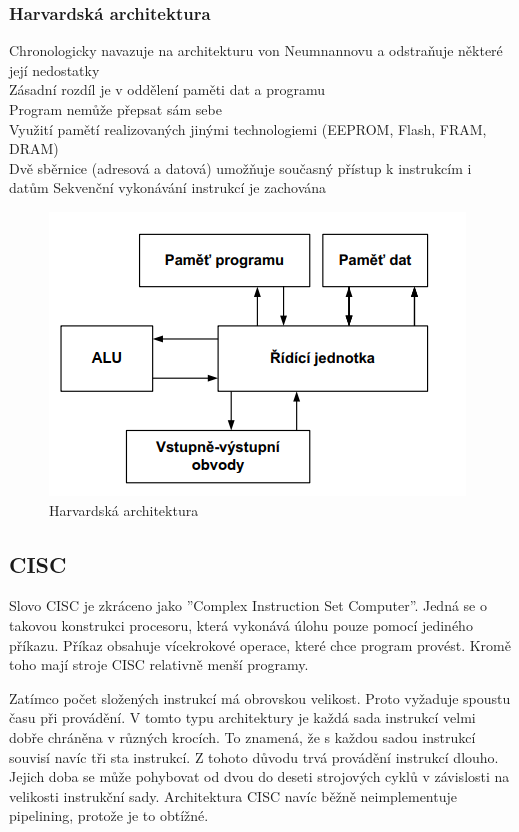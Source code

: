 \subsubsection{Harvardská architektura}
Chronologicky navazuje na architekturu von Neumnannovu a odstraňuje některé její nedostatky\\
Zásadní rozdíl je v oddělení paměti dat a programu\\
Program nemůže přepsat sám sebe\\
Využití pamětí realizovaných jinými technologiemi (EEPROM, Flash, FRAM, DRAM)\\
Dvě sběrnice (adresová a datová) umožňuje současný přístup k instrukcím i datům
Sekvenční vykonávání instrukcí je zachována\\
    \begin{figure}[h]
   \begin{center}
     \includegraphics[scale=0.5]{images/HAR.png}
   \end{center}
   \caption{Harvardská architektura}
  \end{figure}


\subsection{CISC}
Slovo CISC je zkráceno jako ''Complex Instruction Set Computer''. Jedná se o takovou konstrukci procesoru, která vykonává úlohu pouze pomocí jediného příkazu. Příkaz obsahuje vícekrokové operace, které chce program provést. Kromě toho mají stroje CISC relativně menší programy.

Zatímco počet složených instrukcí má obrovskou velikost. Proto vyžaduje spoustu času při provádění. V tomto typu architektury je každá sada instrukcí velmi dobře chráněna v různých krocích. To znamená, že s každou sadou instrukcí souvisí navíc tři sta instrukcí. Z tohoto důvodu trvá provádění instrukcí dlouho. Jejich doba se může pohybovat od dvou do deseti strojových cyklů v závislosti na velikosti instrukční sady. Architektura CISC navíc běžně neimplementuje pipelining, protože je to obtížné.

